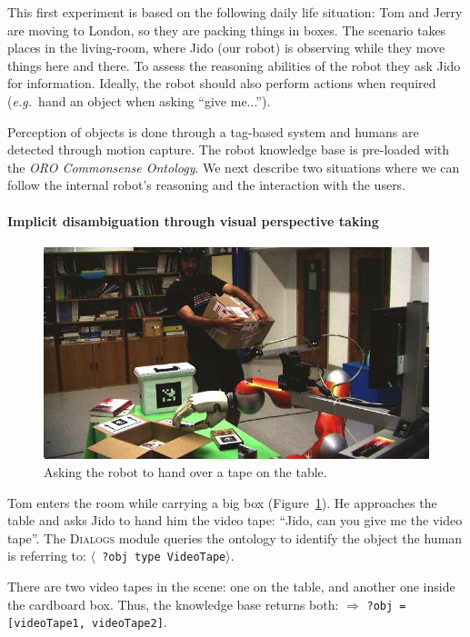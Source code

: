 \documentclass[preprint,3p,times]{elsarticle}
\newcommand{\concept}[1]{{\small \texttt{#1}}}
\newcommand{\stmt}[1]{{\footnotesize \tt $\langle$ #1\relax$\rangle$}}
\newcommand{\eg}{{\textit{e.g.\ }}}
\begin{document}
This first experiment is based on the following daily life situation: Tom and
Jerry are moving to London, so they are packing things in boxes. The scenario
takes places in the living-room, where Jido (our robot) is observing while they
move things here and there. To assess the reasoning abilities of the robot they
ask Jido for information. Ideally, the robot should
also perform actions when required (\eg hand an object when asking ``give
me...'').

Perception of objects is done through a tag-based system and humans are
detected through motion capture. The robot knowledge base is pre-loaded with
the \emph{ORO Commonsense Ontology}.  We next describe two
situations where we can follow the internal robot's reasoning and the
interaction with the users.

\paragraph{Implicit disambiguation through visual perspective taking}

\begin{figure}[!ht]
  \centering
  \includegraphics[width=0.9\linewidth]{pt.jpg}
\caption{Asking the robot to hand over a tape on the table.}
  \label{fig|vpt}
\end{figure}


Tom enters the room while carrying a big box (Figure~\ref{fig|vpt}). He
approaches the table and asks Jido to hand him the video tape: ``Jido, can
you give me the video tape''. The \textsc{Dialogs} module queries the ontology to
identify the object the human is referring to: \stmt{?obj type VideoTape}. 

There are two video tapes in the scene: one on the table, and another one
inside the cardboard box. Thus, the knowledge base returns both: $\Rightarrow$
\concept{?obj = [videoTape1, videoTape2]}. 
\end{document}
